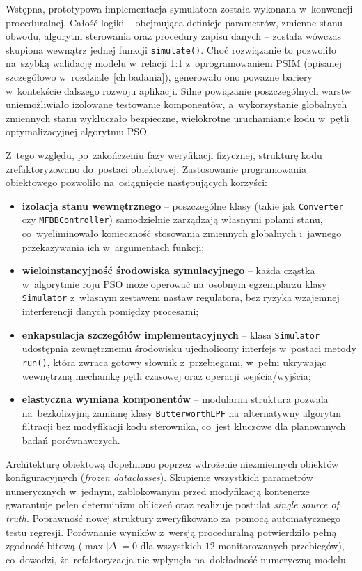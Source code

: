 Wstępna, prototypowa implementacja symulatora została wykonana w~konwencji proceduralnej. Całość logiki -- obejmująca definicje parametrów, zmienne stanu obwodu, algorytm sterowania oraz procedury zapisu danych -- została wówczas skupiona wewnątrz jednej funkcji \texttt{simulate()}. Choć rozwiązanie to pozwoliło na~szybką walidację modelu w~relacji 1:1 z~oprogramowaniem PSIM (opisanej szczegółowo w~rozdziale~\ref{ch:badania}), generowało ono poważne bariery w~kontekście dalszego rozwoju aplikacji. Silne powiązanie poszczególnych warstw uniemożliwiało izolowane testowanie komponentów, a~wykorzystanie globalnych zmiennych stanu wykluczało bezpieczne, wielokrotne uruchamianie kodu w~pętli optymalizacyjnej algorytmu PSO.

Z~tego względu, po~zakończeniu fazy weryfikacji fizycznej, strukturę kodu zrefaktoryzowano do~postaci obiektowej. Zastosowanie programowania obiektowego pozwoliło na~osiągnięcie następujących korzyści:

\begin{itemize}
    \item \textbf{izolacja stanu wewnętrznego} -- poszczególne klasy (takie jak \texttt{Converter} czy \texttt{MFBBController}) samodzielnie zarządzają własnymi polami stanu, co~wyeliminowało konieczność stosowania zmiennych globalnych i~jawnego przekazywania ich w~argumentach funkcji;
    \item \textbf{wieloinstancyjność środowiska symulacyjnego} -- każda cząstka w~algorytmie roju PSO może operować na~osobnym egzemplarzu klasy \texttt{Simulator} z~własnym zestawem nastaw regulatora, bez ryzyka wzajemnej interferencji danych pomiędzy procesami;
    \item \textbf{enkapsulacja szczegółów implementacyjnych} -- klasa \texttt{Simulator} udostępnia zewnętrznemu środowisku ujednolicony interfejs w~postaci metody \texttt{run()}, która zwraca gotowy słownik z~przebiegami, w~pełni ukrywając wewnętrzną mechanikę pętli czasowej oraz operacji wejścia/wyjścia;
    \item \textbf{elastyczna wymiana komponentów} -- modularna struktura pozwala na~bezkolizyjną zamianę klasy \texttt{ButterworthLPF} na~alternatywny algorytm filtracji bez modyfikacji kodu sterownika, co~jest kluczowe dla planowanych badań porównawczych.
\end{itemize}

Architekturę obiektową dopełniono poprzez wdrożenie niezmiennych obiektów konfiguracyjnych (\emph{frozen dataclasses}). Skupienie wszystkich parametrów numerycznych w~jednym, zablokowanym przed modyfikacją kontenerze gwarantuje pełen determinizm obliczeń oraz realizuje postulat \emph{single source of truth}. Poprawność nowej struktury zweryfikowano za~pomocą automatycznego testu regresji. Porównanie wyników z~wersją proceduralną potwierdziło pełną zgodność bitową ($\max|\Delta|=0$ dla wszystkich $12$ monitorowanych przebiegów), co~dowodzi, że~refaktoryzacja nie wpłynęła na~dokładność numeryczną modelu.

